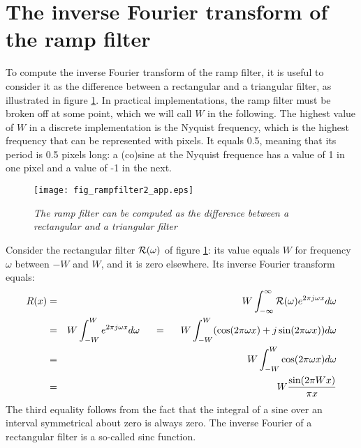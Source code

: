 \newpage
\section{The inverse Fourier transform of the ramp filter \label{app:ramp}}
To compute the inverse Fourier transform of the ramp filter, it is
useful to consider it as the difference between a rectangular and a
triangular filter, as illustrated in figure \ref{fig:rampapp2}. In
practical implementations, the ramp filter must be broken off at some
point, which we will call $W$ in the following. The highest value of
$W$ in a discrete implementation is the Nyquist frequency, which is
the highest frequency that can be represented with pixels. It equals
0.5, meaning that its period is 0.5 pixels long: a (co)sine at the
Nyquist frequence has a value of 1 in one pixel and a value of -1 in
the next.

\begin{figure}[tbh]
\centering
\texttt{[image: fig\_rampfilter2\_app.eps]}
\caption{\label{fig:rampapp2} \emph{The ramp filter can be computed as
    the difference between a rectangular and a triangular filter}}
\end{figure}

Consider the rectangular filter ${\cal R}(\omega)$ of figure  \ref{fig:rampapp2}: its
value equals $W$ for frequency $\omega$ between $-W$ and $W$, and it is
zero elsewhere. Its inverse Fourier transform equals:
\begin{eqnarray}
R(x) & = & W \int_{-\infty}^{\infty} {\cal R}(\omega) e^{2\pi j \omega x} 
           d\omega \nonumber\\
 &=& W \int_{-W}^W e^{2\pi j \omega x} d\omega 
   \hspace{5mm} = \hspace{5mm} 
     W \int_{-W}^W (\cos(2\pi \omega x) + j \sin(2\pi \omega x)) d\omega 
       \nonumber\\
 &=& W \int_{-W}^W \cos(2\pi \omega x) d\omega \nonumber\\
 & = & W \frac{\sin(2\pi W x)}{\pi x} 
\end{eqnarray}
The third equality follows from the fact that the integral of a sine
over an interval symmetrical about zero is always zero. The inverse
Fourier of a rectangular filter is a so-called sinc function.

